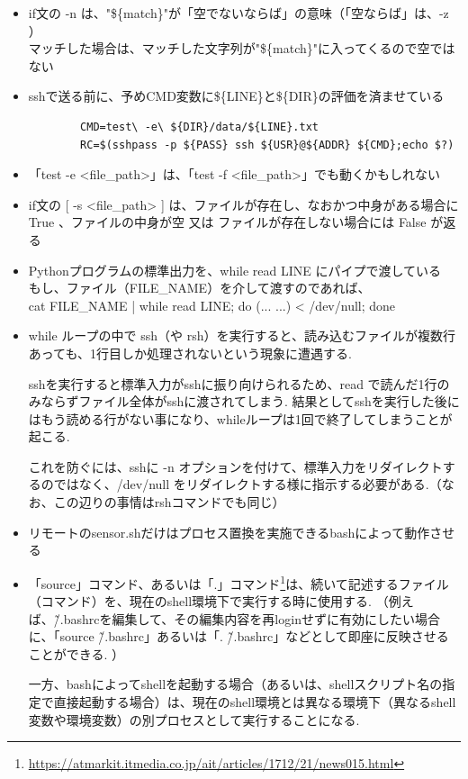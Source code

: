 \documentclass[12pt,a4j]{jsbook}
\begin{document}
\begin{itemize}
	\item if文の -n は、"\$\{match\}"が「空でないならば」の意味（「空ならば」は、-z ）\\マッチした場合は、マッチした文字列が"\$\{match\}"に入ってくるので空ではない
	\item sshで送る前に、予めCMD変数に\$\{LINE\}と\$\{DIR\}の評価を済ませている
	\begin{verbatim}
		CMD=test\ -e\ ${DIR}/data/${LINE}.txt
		RC=$(sshpass -p ${PASS} ssh ${USR}@${ADDR} ${CMD};echo $?)
	\end{verbatim}
	\item 「test -e <file\_path>」は、「test -f <file\_path>」でも動くかもしれない\\
	\item if文の [ -s <file\_path> ] は、ファイルが存在し、なおかつ中身がある場合に True 、ファイルの中身が空 又は ファイルが存在しない場合には False が返る
	\item Pythonプログラムの標準出力を、while read LINE にパイプで渡している\\もし、ファイル（FILE\_NAME）を介して渡すのであれば、\\ cat FILE\_NAME | while read LINE; do (... ...) < /dev/null; done
	\item while ループの中で ssh（や rsh）を実行すると、読み込むファイルが複数行あっても、1行目しか処理されないという現象に遭遇する.

	sshを実行すると標準入力がsshに振り向けられるため、read で読んだ1行のみならずファイル全体がsshに渡されてしまう. 結果としてsshを実行した後にはもう読める行がない事になり、whileループは1回で終了してしまうことが起こる.

	これを防ぐには、sshに -n オプションを付けて、標準入力をリダイレクトするのではなく、/dev/null をリダイレクトする様に指示する必要がある.（なお、この辺りの事情はrshコマンドでも同じ）
	\item リモートのsensor.shだけはプロセス置換を実施できるbashによって動作させる %
	\item 「source」コマンド、あるいは「.」コマンド\footnote{\url{https://atmarkit.itmedia.co.jp/ait/articles/1712/21/news015.html}}は、続いて記述するファイル（コマンド）を、現在のshell環境下で実行する時に使用する. （例えば、\~/.bashrcを編集して、その編集内容を再loginせずに有効にしたい場合に、「source \~/.bashrc」あるいは「. \~/.bashrc」などとして即座に反映させることができる. ）

	一方、bashによってshellを起動する場合（あるいは、shellスクリプト名の指定で直接起動する場合）は、現在のshell環境とは異なる環境下（異なるshell変数や環境変数）の別プロセスとして実行することになる.


\end{itemize}
\end{document}
